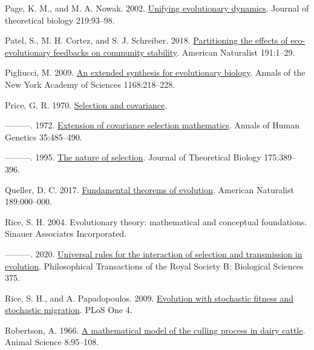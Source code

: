 \documentclass[
]{article}
\newlength{\cslhangindent}
\newenvironment{CSLReferences}[2] %
 {\begin{list}{}{%
  \setlength{\itemindent}{0pt}
  \setlength{\leftmargin}{0pt}
  \setlength{\parsep}{0pt}
  \ifodd #1
   \setlength{\leftmargin}{\cslhangindent}
   \setlength{\itemindent}{-1\cslhangindent}
  \fi
  \setlength{\itemsep}{#2\baselineskip}}}
 {\end{list}}
\begin{document}
\begin{CSLReferences}{0}{0}
Page, K. M., and M. A. Nowak. 2002.
\href{https://doi.org/10.1006/jtbi.2002.3112}{Unifying evolutionary
dynamics}. Journal of theoretical biology 219:93--98.

Patel, S., M. H. Cortez, and S. J. Schreiber. 2018.
\href{https://doi.org/10.1101/104505}{{Partitioning the effects of
eco-evolutionary feedbacks on community stability}}. American Naturalist
191:1--29.

Pigliucci, M. 2009.
\href{https://doi.org/10.1111/j.1749-6632.2009.04578.x}{{An extended
synthesis for evolutionary biology}}. Annals of the New York Academy of
Sciences 1168:218--228.

Price, G. R. 1970. \href{https://doi.org/10.1038/227520a0}{{Selection
and covariance}}.

---------. 1972.
\href{https://doi.org/10.1111/j.1469-1809.1957.tb01874.x}{{Extension of
covariance selection mathematics}}. Annals of Human Genetics
35:485--490.

---------. 1995. \href{https://doi.org/10.1006/jtbi.1995.0149}{{The
nature of selection}}. Journal of Theoretical Biology 175:389--396.

Queller, D. C. 2017. \href{https://doi.org/10.1086/690937}{{Fundamental
theorems of evolution}}. American Naturalist 189:000--000.

Rice, S. H. 2004. {Evolutionary theory: mathematical and conceptual
foundations}. Sinauer Associates Incorporated.

---------. 2020.
\href{https://doi.org/10.1098/rstb.2019.0353}{{Universal rules for the
interaction of selection and transmission in evolution}}. Philosophical
Transactions of the Royal Society B: Biological Sciences 375.

Rice, S. H., and A. Papadopoulos. 2009.
\href{https://doi.org/10.1371/journal.pone.0007130}{{Evolution with
stochastic fitness and stochastic migration}}. PLoS One 4.

Robertson, A. 1966. \href{https://doi.org/10.1017/S0003356100037752}{{A
mathematical model of the culling process in dairy cattle}}. Animal
Science 8:95--108.


\end{CSLReferences}
\end{document}
